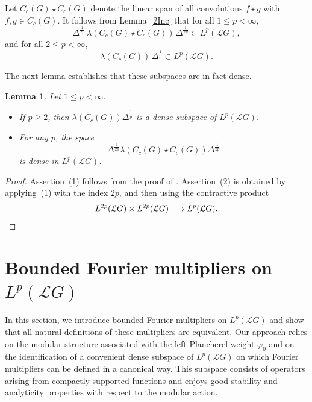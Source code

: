 \documentclass[12pt]{amsart}
\newtheorem{lemma}[theorem]{Lemma}
\theoremstyle{remark}
\theoremstyle{definition}
\numberwithin{equation}{section}
\begin{document}
Let $C_c(G) \star C_c(G)$ denote the linear span of all convolutions $f \star g$ with $f,g \in C_c(G)$.  
It follows from Lemma~\ref{2Inc} that for all \(1 \leq p < \infty\),
\[
\Delta^{\frac{1}{2p}} \, \lambda(C_c(G) \star C_c(G)) \, \Delta^{\frac{1}{2p}} \subset L^p(\mathcal{L}G),
\]
and for all \(2 \leq p < \infty\),
\[
\lambda(C_c(G)) \, \Delta^{\frac{1}{p}} \subset L^p(\mathcal{L}G).
\]

The next lemma establishes that these subspaces are in fact dense.


\begin{lemma}\label{2Dense}
Let $1 \leq p < \infty$.
\begin{itemize}
\item[(1)] If $p \geq 2$, then $\lambda(C_c(G)) \Delta^{\frac{1}{p}}$ is a dense subspace of
$L^p({\mathcal L}G)$.
\item[(2)] For any $p$, the space
\[
\Delta^{\frac{1}{2p}} \lambda(C_c(G) \star C_c(G)) \Delta^{\frac{1}{2p}}
\]
is dense in $L^p({\mathcal L}G)$.
\end{itemize}
\end{lemma}

\begin{proof}
Assertion~(1) follows from the proof of \cite[Theorem~4.5, (2)]{Terp2}.  
Assertion~(2) is obtained by applying~(1) with the index $2p$, and then using the contractive
product
\[
L^{2p}({\mathcal L}G) \times L^{2p}({\mathcal L}G) \longrightarrow L^p({\mathcal L}G).
\qedhere\]
\end{proof}






















\medskip
\section{Bounded Fourier multipliers on $L^p({\mathcal L}G)$}\label{3}

In this section, we introduce bounded Fourier multipliers on $L^p(\mathcal{L}G)$ and show that all natural definitions of these multipliers are equivalent. 
Our approach relies on the modular structure associated with the left Plancherel weight $\varphi_0$ and on the identification of a convenient dense subspace of $L^p(\mathcal{L}G)$ on which Fourier multipliers can be defined in a canonical way. 
This subspace consists of operators arising from compactly supported functions and enjoys good stability and analyticity properties with respect to the modular action. 
\end{document}
